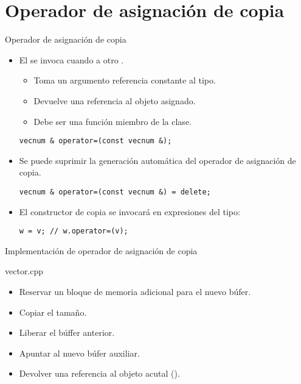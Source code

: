 \section{Operador de asignación de copia}

\begin{frame}[t,fragile]{Operador de asignación de copia}
\begin{itemize}
  \item El  se invoca cuando
         a otro .
    \begin{itemize}
      \item Toma un argumento referencia constante al tipo.
      \item Devuelve una referencia al objeto asignado.
      \item Debe ser una función miembro de la clase.
    \end{itemize}
\begin{lstlisting}
vecnum & operator=(const vecnum &);
\end{lstlisting}

  \item Se puede suprimir la generación automática del operador de asignación de copia.
\begin{lstlisting}
vecnum & operator=(const vecnum &) = delete;
\end{lstlisting}

  \item El constructor de copia se invocará en expresiones del tipo:
\begin{lstlisting}
w = v; // w.operator=(v);
\end{lstlisting}
\end{itemize}
\end{frame}

\begin{frame}[t]{Implementación de operador de asignación de copia}
\begin{block}{vector.cpp}

\end{block}

\begin{itemize}
  \item Reservar un bloque de memoria adicional para el nuevo búfer.
  \item Copiar el tamaño.
  \item Liberar el búffer anterior.
  \item Apuntar  al nuevo búfer auxiliar.
  \item Devolver una referencia al objeto acutal ().
\end{itemize}
\end{frame}

